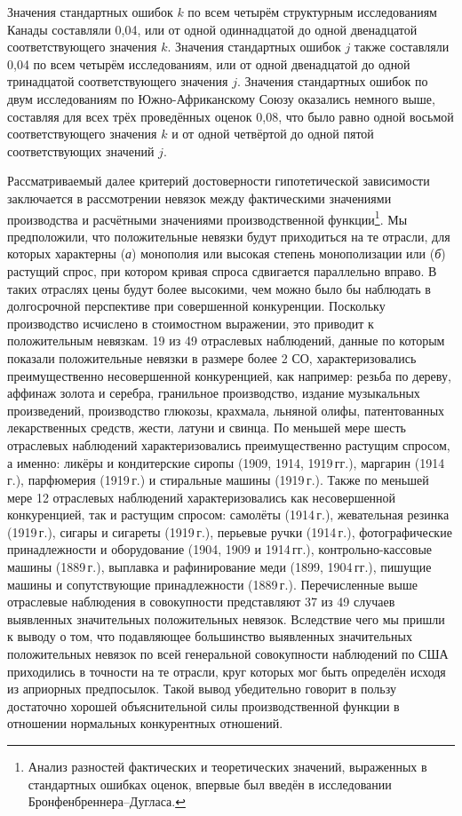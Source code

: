 \documentclass{article}
\begin{document}
Значения стандартных ошибок \(k\) по всем четырём структурным исследованиям Канады составляли 0,04, или от одной одиннадцатой до одной двенадцатой соответствующего значения \(k\). Значения стандартных ошибок \(j\) также составляли 0,04 по всем четырём исследованиям, или от одной двенадцатой до одной тринадцатой соответствующего значения \(j\). Значения стандартных ошибок по двум исследованиям по Южно-Африканскому Союзу оказались немного выше, составляя для всех трёх проведённых оценок 0,08, что было равно одной восьмой соответствующего значения \(k\) и от одной четвёртой до одной пятой соответствующих значений \(j\). %

Рассматриваемый далее критерий достоверности гипотетической зависимости заключается в рассмотрении невязок между фактическими значениями производства и расчётными значениями производственной функции\footnote{Анализ разностей фактических и теоретических значений, выраженных в стандартных ошибках оценок, впервые был введён в исследовании Бронфенбреннера--Дугласа.}. Мы предположили, что положительные невязки будут приходиться на те отрасли, для которых характерны (\emph{а}) монополия или высокая степень монополизации или (\emph{б}) растущий спрос, при котором кривая спроса сдвигается параллельно вправо. В таких отраслях цены будут более высокими, чем можно было бы наблюдать в долгосрочной перспективе при совершенной конкуренции. Поскольку производство исчислено в стоимостном выражении, это приводит к положительным невязкам. 19 из 49 отраслевых наблюдений, данные по которым показали положительные невязки в размере более 2 СО, характеризовались преимущественно несовершенной конкуренцией, как например: резьба по дереву, аффинаж золота и серебра, гранильное производство, издание музыкальных произведений, производство глюкозы, крахмала, льняной олифы, патентованных лекарственных средств, жести, латуни и свинца. По меньшей мере шесть отраслевых наблюдений характеризовались преимущественно растущим спросом, а именно: ликёры и кондитерские сиропы (1909, 1914, 1919\,гг.), маргарин (1914\,г.), парфюмерия (1919\,г.) и стиральные машины (1919\,г.). Также по меньшей мере 12 отраслевых наблюдений характеризовались как несовершенной конкуренцией, так и растущим спросом: самолёты (1914\,г.), жевательная резинка (1919\,г.), сигары и сигареты (1919\,г.), перьевые ручки (1914\,г.), фотографические принадлежности и оборудование (1904, 1909 и 1914\,гг.), контрольно-кассовые машины (1889\,г.), выплавка и рафинирование меди (1899, 1904\,гг.), пишущие машины и сопутствующие принадлежности (1889\,г.). Перечисленные выше отраслевые наблюдения в совокупности представляют %
37 из 49 случаев выявленных значительных положительных невязок. Вследствие чего мы пришли к выводу о том, что подавляющее большинство выявленных значительных положительных невязок по всей генеральной совокупности наблюдений по США приходились в точности на те отрасли, круг которых мог быть определён исходя из априорных предпосылок. Такой вывод убедительно говорит в пользу достаточно хорошей объяснительной силы производственной функции в отношении нормальных конкурентных отношений.
\end{document}
